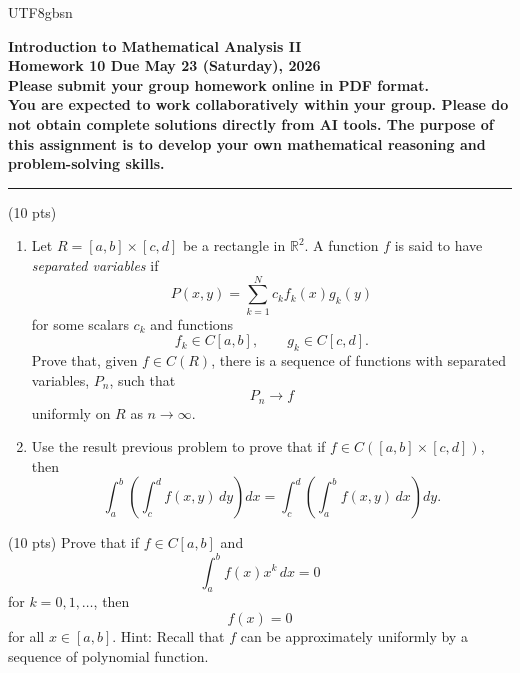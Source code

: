 \documentclass[addpoints]{exam}
\theoremstyle{definition}
\begin{document}
\begin{CJK*}{UTF8}{gbsn}
\begin{center}
    {\Large{\bf Introduction to Mathematical Analysis II\\
    Homework 10  Due  May 23  (Saturday), 2026\\
    Please submit your group homework online in PDF format.\\
You are expected to work collaboratively within your group. 
Please do not obtain complete solutions directly from AI tools. 
The purpose of this assignment is to develop your own mathematical reasoning and problem-solving skills. %
  }} \\ 
    \large
\end{center}

\noindent\rule{16.2cm}{0.4pt}


\begin{questions}


\question  (10 pts) 

\begin{enumerate}

\item Let \(R=[a,b]\times[c,d]\) be a rectangle in \(\mathbb{R}^2\). A function \(f\)
is said to have \emph{separated variables} if
\[
P(x,y)=\sum_{k=1}^{N} c_k f_k(x)g_k(y)
\]
for some scalars \(c_k\) and functions
\[
f_k\in C[a,b],
\qquad
g_k\in C[c,d].
\]
Prove that, given \(f\in C(R)\), there is a sequence of functions with
separated variables, \(P_n\), such that
\[
P_n\to f
\]
uniformly on \(R\) as \(n\to\infty\).

\item Use the result  previous problem to prove that if \(f\in C([a,b]\times[c,d])\), then
\[
\int_a^b
\left(
\int_c^d f(x,y)\,dy
\right)dx
=
\int_c^d
\left(
\int_a^b f(x,y)\,dx
\right)dy.
\]

\end{enumerate}
\begin{solution}
\end{solution}

\question (10 pts) 
Prove that if \(f\in C[a,b]\) and
\[
\int_a^b f(x)x^k\,dx=0
\]
for \(k=0,1,\ldots\), then
\[
f(x)=0
\]
for all \(x\in[a,b]\).
Hint: Recall that $f$ can be approximately uniformly by a sequence of polynomial function.


\begin{solution}


\end{solution}



\end{questions}
\end{CJK*}
\end{document}
